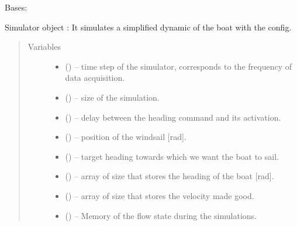 \documentclass[letterpaper,10pt,english]{sphinxmanual}
\begin{document}
\begin{fulllineitems}
\label{\detokenize{package1:Simulator.Simulator}}
Bases: 

Simulator object : It simulates a simplified dynamic of the boat with the config.
\begin{quote}\begin{description}
\item[{Variables}] \leavevmode\begin{itemize}
\item {} 
 () -- time step of the simulator, corresponds to the frequency of data acquisition.

\item {} 
 () -- size of the simulation.

\item {} 
 () -- delay between the heading command and its activation.

\item {} 
 () -- position of the windsail {[}rad{]}.

\item {} 
 () -- target heading towards which we want the boat to sail.

\item {} 
 (\sphinxstyleliteralemphasis{(}\sphinxstyleliteralemphasis{)}) -- array of size  that stores the heading of the boat {[}rad{]}.

\item {} 
 (\sphinxstyleliteralemphasis{(}\sphinxstyleliteralemphasis{)}) -- array of size  that stores the velocity made good.

\item {} 
 ({\hyperref[\detokenize{package1:module-Hysteresis}]{}}) -- Memory of the flow state during the simulations.


\end{itemize}
\end{description}
\end{quote}
\end{fulllineitems}
\end{document}
